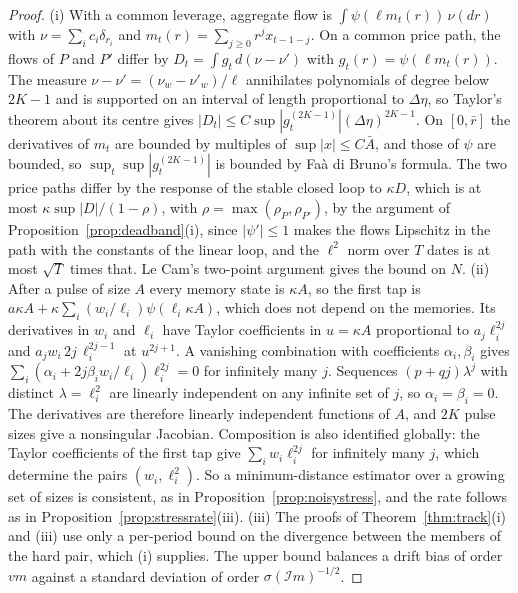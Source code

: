 \documentclass[12pt]{article}
\theoremstyle{definition}
\theoremstyle{remark}
\begin{document}
\begin{proof}
(i) With a common leverage, aggregate flow is $\int\psi(\ell m_t(r))\,\nu(dr)$ with $\nu=\sum_ic_i\delta_{r_i}$ and $m_t(r)=\sum_{j\ge0}r^jx_{t-1-j}$. On a common price path, the flows of $P$ and $P'$ differ by $D_t=\int g_t\,d(\nu-\nu')$ with $g_t(r)=\psi(\ell m_t(r))$. The measure $\nu-\nu'=(\nu_w-\nu'_w)/\ell$ annihilates polynomials of degree below $2K-1$ and is supported on an interval of length proportional to $\Delta\eta$, so Taylor's theorem about its centre gives $|D_t|\le C\sup|g_t^{(2K-1)}|(\Delta\eta)^{2K-1}$. On $[0,\bar r]$ the derivatives of $m_t$ are bounded by multiples of $\sup|x|\le C\bar A$, and those of $\psi$ are bounded, so $\sup_t\sup|g_t^{(2K-1)}|$ is bounded by Fa\`a di Bruno's formula. The two price paths differ by the response of the stable closed loop to $\kappa D$, which is at most $\kappa\sup|D|/(1-\rho)$, with $\rho=\max(\rho_P,\rho_{P'})$, by the argument of Proposition~\ref{prop:deadband}(i), since $|\psi'|\le1$ makes the flows Lipschitz in the path with the constants of the linear loop, and the $\ell^2$ norm over $T$ dates is at most $\sqrt T$ times that. Le Cam's two-point argument gives the bound on $N$. (ii) After a pulse of size $A$ every memory state is $\kappa A$, so the first tap is $a\kappa A+\kappa\sum_i(w_i/\ell_i)\psi(\ell_i\kappa A)$, which does not depend on the memories. Its derivatives in $w_i$ and $\ell_i$ have Taylor coefficients in $u=\kappa A$ proportional to $a_j\ell_i^{2j}$ and $a_jw_i\,2j\,\ell_i^{2j-1}$ at $u^{2j+1}$. A vanishing combination with coefficients $\alpha_i,\beta_i$ gives $\sum_i(\alpha_i+2j\beta_iw_i/\ell_i)\ell_i^{2j}=0$ for infinitely many $j$. Sequences $(p+qj)\lambda^j$ with distinct $\lambda=\ell_i^2$ are linearly independent on any infinite set of $j$, so $\alpha_i=\beta_i=0$. The derivatives are therefore linearly independent functions of $A$, and $2K$ pulse sizes give a nonsingular Jacobian. Composition is also identified globally: the Taylor coefficients of the first tap give $\sum_iw_i\ell_i^{2j}$ for infinitely many $j$, which determine the pairs $(w_i,\ell_i^2)$. So a minimum-distance estimator over a growing set of sizes is consistent, as in Proposition~\ref{prop:noisystress}, and the rate follows as in Proposition~\ref{prop:stressrate}(iii). (iii) The proofs of Theorem~\ref{thm:track}(i) and (iii) use only a per-period bound on the divergence between the members of the hard pair, which (i) supplies. The upper bound balances a drift bias of order $vm$ against a standard deviation of order $\sigma(\mathcal Im)^{-1/2}$.
\end{proof}
\end{document}
